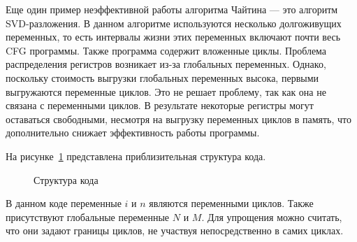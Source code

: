Еще один пример неэффективной работы алгоритма Чайтина — это алгоритм SVD-разложения.  
В данном алгоритме используются несколько долгоживущих переменных,
то есть интервалы жизни этих переменных включают почти весь CFG программы.
Также программа содержит вложенные циклы.
Проблема распределения регистров возникает из-за глобальных переменных.  
Однако, поскольку стоимость выгрузки глобальных переменных высока, первыми выгружаются переменные циклов.  
Это не решает проблему, так как она не связана с переменными циклов.  
В результате некоторые регистры могут оставаться свободными, несмотря на выгрузку переменных циклов в память,  
что дополнительно снижает эффективность работы программы.

На рисунке~\ref{fig:structure} представлена приблизительная структура кода.

\begin{figure}[h]
    \centering
    \caption{Структура кода}
    \label{fig:structure}
\end{figure}

В данном коде переменные $i$ и $n$ являются переменными циклов.  
Также присутствуют глобальные переменные $N$ и $M$.  
Для упрощения можно считать, что они задают границы циклов, не участвуя непосредственно в самих циклах.

